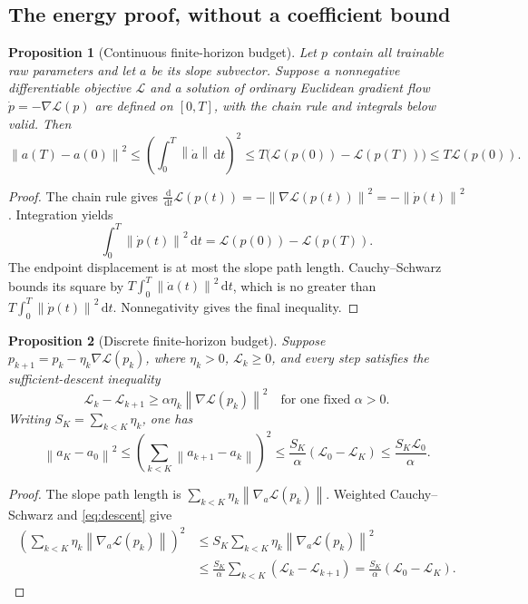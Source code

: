 \documentclass[11pt]{article}
\newtheorem{proposition}{Proposition}[section]
\newcommand{\norm}[1]{\left\lVert#1\right\rVert}
\newcommand{\dd}{\,\mathrm d}
\begin{document}
\subsection{The energy proof, without a coefficient bound}

\begin{proposition}[Continuous finite-horizon budget]
Let $p$ contain all trainable raw parameters and let $a$ be its slope subvector. Suppose a nonnegative differentiable objective $\mathcal L$ and a solution of ordinary Euclidean gradient flow $\dot p=-\nabla\mathcal L(p)$ are defined on $[0,T]$, with the chain rule and integrals below valid. Then
\begin{equation}
 \norm{a(T)-a(0)}^2
 \leq\left(\int_0^T\norm{\dot a}\dd t\right)^2
 \leq T\bigl(\mathcal L(p(0))-\mathcal L(p(T))\bigr)
 \leq T\mathcal L(p(0)).
 \label{eq:energy-flow}
\end{equation}
\end{proposition}
\begin{proof}
The chain rule gives $\frac{\dd}{\dd t}\mathcal L(p(t))=-\norm{\nabla\mathcal L(p(t))}^2=-\norm{\dot p(t)}^2$. Integration yields
\begin{equation}
 \int_0^T\norm{\dot p(t)}^2\dd t=\mathcal L(p(0))-\mathcal L(p(T)).
\end{equation}
The endpoint displacement is at most the slope path length. Cauchy--Schwarz bounds its square by
$T\int_0^T\norm{\dot a(t)}^2\dd t$, which is no greater than
$T\int_0^T\norm{\dot p(t)}^2\dd t$. Nonnegativity gives the final inequality.
\end{proof}

\begin{proposition}[Discrete finite-horizon budget]
Suppose $p_{k+1}=p_k-\eta_k\nabla\mathcal L(p_k)$, where $\eta_k>0$, $\mathcal L_k\geq0$, and every step satisfies the sufficient-descent inequality
\begin{equation}
 \mathcal L_k-\mathcal L_{k+1}
 \geq\alpha\eta_k\norm{\nabla\mathcal L(p_k)}^2
 \quad\text{for one fixed }\alpha>0.
 \label{eq:descent}
\end{equation}
Writing $S_K=\sum_{k<K}\eta_k$, one has
\begin{equation}
 \norm{a_K-a_0}^2
 \leq\left(\sum_{k<K}\norm{a_{k+1}-a_k}\right)^2
 \leq\frac{S_K}{\alpha}(\mathcal L_0-\mathcal L_K)
 \leq\frac{S_K\mathcal L_0}{\alpha}.
 \label{eq:energy-GD}
\end{equation}
\end{proposition}
\begin{proof}
The slope path length is $\sum_{k<K}\eta_k\norm{\nabla_a\mathcal L(p_k)}$. Weighted Cauchy--Schwarz and \eqref{eq:descent} give
\begin{align}
 \left(\sum_{k<K}\eta_k\norm{\nabla_a\mathcal L(p_k)}\right)^2
 &\leq S_K\sum_{k<K}\eta_k\norm{\nabla_a\mathcal L(p_k)}^2\\
 &\leq\frac{S_K}{\alpha}\sum_{k<K}(\mathcal L_k-\mathcal L_{k+1})
 =\frac{S_K}{\alpha}(\mathcal L_0-\mathcal L_K).
\end{align}
\end{proof}
\end{document}
